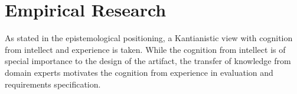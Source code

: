 %
%	
%
%
%
%
%		
		
		
	
\section{Empirical Research}
	As stated in the epistemological positioning, a Kantianistic view with cognition from intellect and experience is taken. While the cognition from intellect is of special importance to the design of the artifact, the transfer of knowledge from domain experts motivates the cognition from experience in evaluation and requirements specification. 
	
